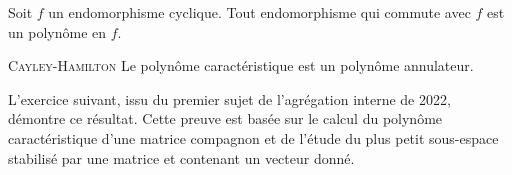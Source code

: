 \begin{prop}{}
    Soit $f$ un endomorphisme cyclique. Tout endomorphisme qui commute avec $f$ est un polynôme en $f$.
\end{prop}

\begin{preuve}
    
\end{preuve}

\begin{theo}{\textsc{Cayley}-\textsc{Hamilton}}
    Le polynôme caractéristique est un polynôme annulateur.
\end{theo}

L'exercice suivant, issu du premier sujet de l'agrégation interne de 2022, démontre ce résultat. Cette preuve est basée sur le calcul du polynôme caractéristique d'une matrice compagnon et de l'étude du plus petit sous-espace stabilisé par une matrice et contenant un vecteur donné. \\



